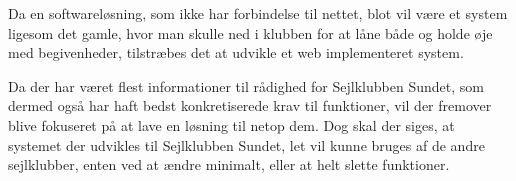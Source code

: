 Da en softwareløsning, som ikke har forbindelse til nettet, blot vil være et system ligesom det gamle, hvor man skulle
ned i klubben for at låne både og holde øje med begivenheder, tilstræbes det at udvikle et web implementeret system. 

Da der har været flest informationer til rådighed for Sejlklubben Sundet, som dermed også har haft bedst konkretiserede
krav til funktioner, vil der fremover blive fokuseret på at lave en løsning til netop dem. Dog skal der siges, at
systemet der udvikles til Sejlklubben Sundet, let vil kunne bruges af de andre sejlklubber, enten ved at ændre minimalt,
eller at helt slette funktioner.






